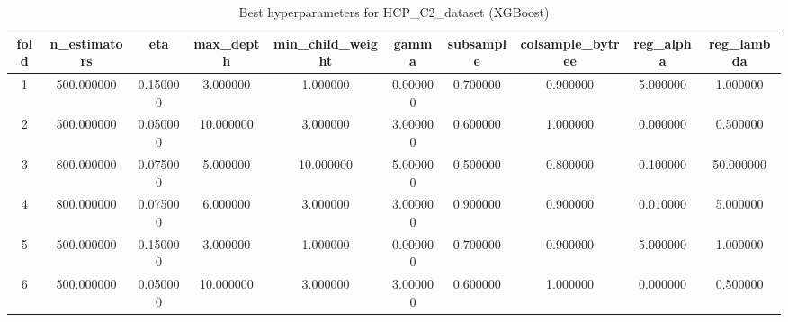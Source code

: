 \begin{table}[htbp]
\caption{Best hyperparameters for HCP_C2_dataset (XGBoost)}
\label{tab:best_hyperparams_HCP_C2_dataset}
\begin{tabular}{cccccccccc}
\toprule
fold & n_estimators & eta & max_depth & min_child_weight & gamma & subsample & colsample_bytree & reg_alpha & reg_lambda \\
\midrule
1 & 500.000000 & 0.150000 & 3.000000 & 1.000000 & 0.000000 & 0.700000 & 0.900000 & 5.000000 & 1.000000 \\
2 & 500.000000 & 0.050000 & 10.000000 & 3.000000 & 3.000000 & 0.600000 & 1.000000 & 0.000000 & 0.500000 \\
3 & 800.000000 & 0.075000 & 5.000000 & 10.000000 & 5.000000 & 0.500000 & 0.800000 & 0.100000 & 50.000000 \\
4 & 800.000000 & 0.075000 & 6.000000 & 3.000000 & 3.000000 & 0.900000 & 0.900000 & 0.010000 & 5.000000 \\
5 & 500.000000 & 0.150000 & 3.000000 & 1.000000 & 0.000000 & 0.700000 & 0.900000 & 5.000000 & 1.000000 \\
6 & 500.000000 & 0.050000 & 10.000000 & 3.000000 & 3.000000 & 0.600000 & 1.000000 & 0.000000 & 0.500000 \\
\bottomrule
\end{tabular}
\end{table}
